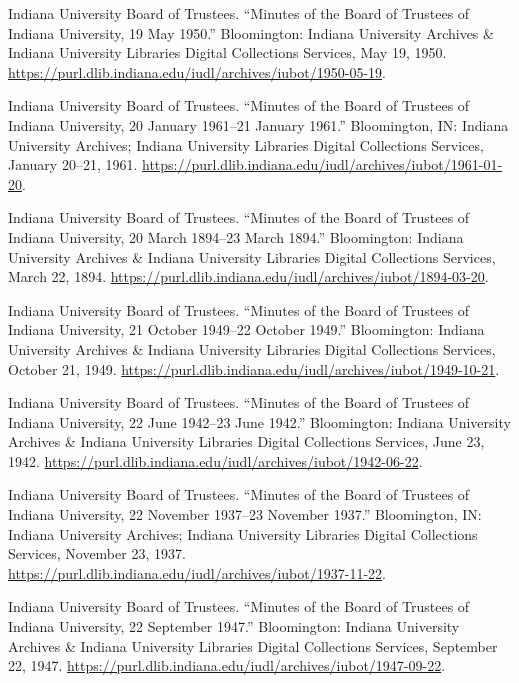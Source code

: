 \documentclass[
  american,
  letterpaper,
]{scrreprt}
\newlength{\cslhangindent}
\newenvironment{CSLReferences}[2] %
 {\begin{list}{}{%
  \setlength{\itemindent}{0pt}
  \setlength{\leftmargin}{0pt}
  \setlength{\parsep}{0pt}
  \ifodd #1
   \setlength{\leftmargin}{\cslhangindent}
   \setlength{\itemindent}{-1\cslhangindent}
  \fi
  \setlength{\itemsep}{#2\baselineskip}}}
 {\end{list}}
\begin{document}
\begin{CSLReferences}{1}{0}
Indiana University Board of Trustees. {``Minutes of the Board of
Trustees of Indiana University, 19 May 1950.''} Bloomington: Indiana
University Archives \& Indiana University Libraries Digital Collections
Services, May 19, 1950.
\url{https://purl.dlib.indiana.edu/iudl/archives/iubot/1950-05-19}.

Indiana University Board of Trustees. {``Minutes of the Board of
Trustees of Indiana University, 20 January 1961--21 January 1961.''}
Bloomington, IN: Indiana University Archives; Indiana University
Libraries Digital Collections Services, January 20--21, 1961.
\url{https://purl.dlib.indiana.edu/iudl/archives/iubot/1961-01-20}.

Indiana University Board of Trustees. {``Minutes of the Board of
Trustees of Indiana University, 20 March 1894--23 March 1894.''}
Bloomington: Indiana University Archives \& Indiana University Libraries
Digital Collections Services, March 22, 1894.
\url{https://purl.dlib.indiana.edu/iudl/archives/iubot/1894-03-20}.

Indiana University Board of Trustees. {``Minutes of the Board of
Trustees of Indiana University, 21 October 1949--22 October 1949.''}
Bloomington: Indiana University Archives \& Indiana University Libraries
Digital Collections Services, October 21, 1949.
\url{https://purl.dlib.indiana.edu/iudl/archives/iubot/1949-10-21}.

Indiana University Board of Trustees. {``Minutes of the Board of
Trustees of Indiana University, 22 June 1942--23 June 1942.''}
Bloomington: Indiana University Archives \& Indiana University Libraries
Digital Collections Services, June 23, 1942.
\url{https://purl.dlib.indiana.edu/iudl/archives/iubot/1942-06-22}.

Indiana University Board of Trustees. {``Minutes of the Board of
Trustees of Indiana University, 22 November 1937--23 November 1937.''}
Bloomington, IN: Indiana University Archives; Indiana University
Libraries Digital Collections Services, November 23, 1937.
\url{https://purl.dlib.indiana.edu/iudl/archives/iubot/1937-11-22}.

Indiana University Board of Trustees. {``Minutes of the Board of
Trustees of Indiana University, 22 September 1947.''} Bloomington:
Indiana University Archives \& Indiana University Libraries Digital
Collections Services, September 22, 1947.
\url{https://purl.dlib.indiana.edu/iudl/archives/iubot/1947-09-22}.


\end{CSLReferences}
\end{document}
